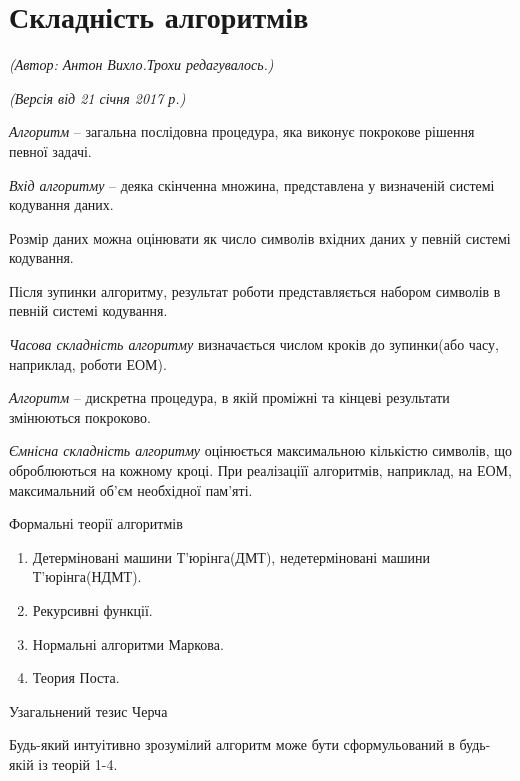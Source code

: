 \section{Складність алгоритмів}
\begin{flushright}
\emph{(Автор: Антон Вихло.Трохи редагувалось.)}
\par \emph{(Версія від 21 січня 2017 р.)}
\end{flushright}

\emph{Алгоритм} -- загальна послідовна процедура, яка виконує покрокове рішення певної задачі.

\emph{Вхід алгоритму} -- деяка скінченна множина, представлена у визначеній системі кодування даних.

Розмір даних можна оцінювати як число символів вхідних даних у певній системі кодування.

Після зупинки алгоритму, результат роботи представляється набором символів в певній системі кодування.

\emph{Часова складність алгоритму} визначається числом кроків до зупинки(або часу, наприклад, роботи ЕОМ).

\emph{Алгоритм} -- дискретна процедура, в якій проміжні та кінцеві результати змінюються покроково.

\emph{Ємнісна складність алгоритму} оцінюється максимальною кількістю символів, що оброблюються на кожному кроці. При реалізаціїї алгоритмів, наприклад, на ЕОМ, максимальний об'єм необхідної пам'яті.
\begin{center} Формальні теорії алгоритмів \end{center}
\begin{enumerate} 
\item Детерміновані машини Т'юрінга(ДМТ), недетерміновані машини Т'юрінга(НДМТ).
\item Рекурсивні функції.
\item Нормальні алгоритми Маркова.
\item Теория Поста.
\end{enumerate} 

\begin{center} Узагальнений тезис Черча \end{center}


Будь-який интуітивно зрозумілий алгоритм може бути сформульований в будь-якій із теорій 1-4.

